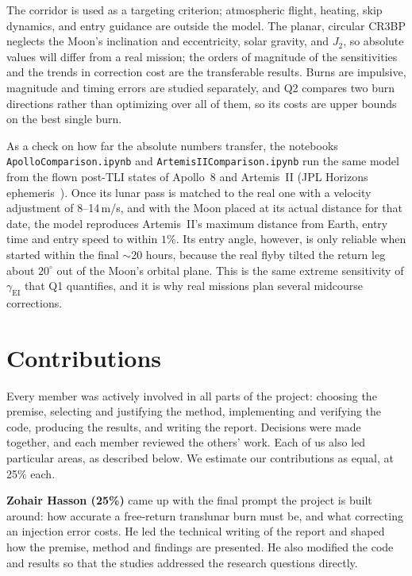 \documentclass[11pt]{article}
\newcommand{\gEI}{\gamma_{\mathrm{EI}}}
\begin{document}
The corridor is used as a targeting criterion; atmospheric flight, heating, skip dynamics, and entry guidance are outside the model. The planar, circular CR3BP neglects the Moon's inclination and eccentricity, solar gravity, and $J_2$, so absolute values will differ from a real mission; the orders of magnitude of the sensitivities and the trends in correction cost are the transferable results. Burns are impulsive, magnitude and timing errors are studied separately, and Q2 compares two burn directions rather than optimizing over all of them, so its costs are upper bounds on the best single burn.

{\sloppy As a check on how far the absolute numbers transfer, the notebooks \texttt{ApolloComparison.ipynb} and \texttt{ArtemisIIComparison.ipynb} run the same model from the flown post-TLI states of Apollo~8 and Artemis~II (JPL Horizons ephemeris~\cite{jpl_horizons}). Once its lunar pass is matched to the real one with a velocity adjustment of 8--14\,m/s, and with the Moon placed at its actual distance for that date, the model reproduces Artemis~II's maximum distance from Earth, entry time and entry speed to within $1\%$. Its entry angle, however, is only reliable when started within the final $\sim$20 hours, because the real flyby tilted the return leg about $20^\circ$ out of the Moon's orbital plane. This is the same extreme sensitivity of $\gEI$ that Q1 quantifies, and it is why real missions plan several midcourse corrections.\par}

\section{Contributions}

Every member was actively involved in all parts of the project: choosing the premise, selecting and justifying the method, implementing and verifying the code, producing the results, and writing the report. Decisions were made together, and each member reviewed the others' work. Each of us also led particular areas, as described below. We estimate our contributions as equal, at 25\% each.

\textbf{Zohair Hasson (25\%)} came up with the final prompt the project is built around: how accurate a free-return translunar burn must be, and what correcting an injection error costs. He led the technical writing of the report and shaped how the premise, method and findings are presented. He also modified the code and results so that the studies addressed the research questions directly.
\end{document}
